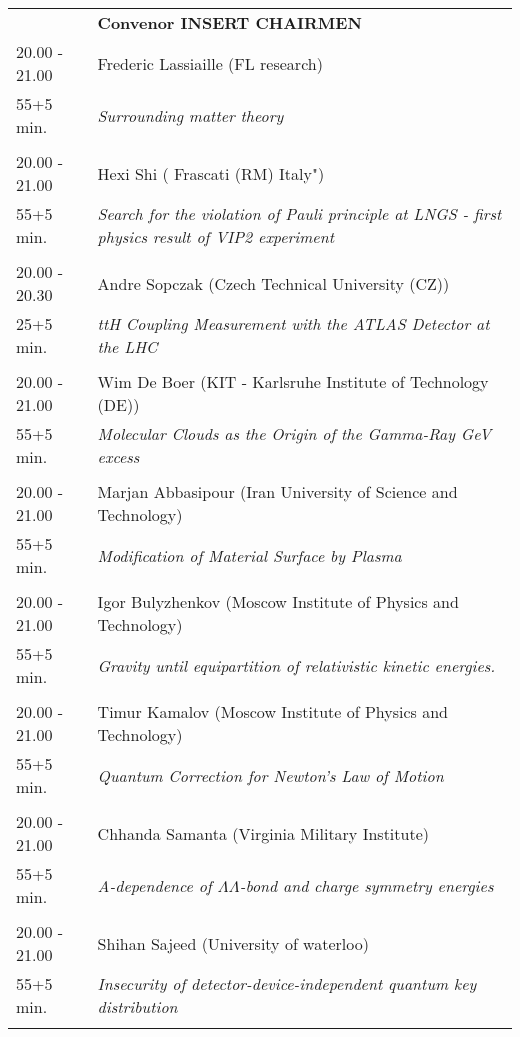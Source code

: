 \begin{longtable}{p{3cm}p{13cm}}
&\hfill {\bf Convenor INSERT CHAIRMEN }\\ 
20.00 - 21.00 & Frederic Lassiaille (FL research)\\ 
55+5 min. & {\it Surrounding matter theory}\\ 
 & \\ 
20.00 - 21.00 & Hexi Shi ( Frascati (RM) Italy")\\ 
55+5 min. & {\it Search for the violation of Pauli principle at LNGS - first physics result of VIP2 experiment}\\ 
 & \\ 
20.00 - 20.30 & Andre Sopczak (Czech Technical University (CZ))\\ 
25+5 min. & {\it ttH Coupling Measurement with the ATLAS Detector at the LHC}\\ 
 & \\ 
20.00 - 21.00 & Wim De Boer (KIT - Karlsruhe Institute of  Technology (DE))\\ 
55+5 min. & {\it Molecular Clouds as the Origin of the Gamma-Ray GeV excess}\\ 
 & \\ 
20.00 - 21.00 & Marjan Abbasipour (Iran University of Science and Technology)\\ 
55+5 min. & {\it Modification of Material Surface by Plasma}\\ 
 & \\ 
20.00 - 21.00 & Igor Bulyzhenkov (Moscow Institute of Physics and Technology)\\ 
55+5 min. & {\it Gravity until equipartition of relativistic kinetic energies.}\\ 
 & \\ 
20.00 - 21.00 & Timur Kamalov (Moscow Institute of Physics and Technology)\\ 
55+5 min. & {\it Quantum Correction for Newton’s Law of Motion}\\ 
 & \\ 
20.00 - 21.00 & Chhanda Samanta (Virginia Military Institute)\\ 
55+5 min. & {\it A-dependence of $\Lambda\Lambda$-bond and charge symmetry energies}\\ 
 & \\ 
20.00 - 21.00 & Shihan Sajeed (University of waterloo)\\ 
55+5 min. & {\it Insecurity of detector-device-independent quantum key distribution}\\ 
 & \\ 

\end{longtable}
